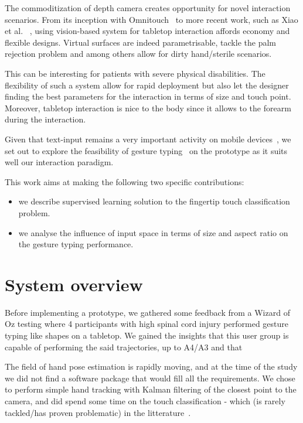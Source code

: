\documentclass{chi-ext}
\begin{document}
The commoditization of depth camera creates opportunity for novel interaction scenarios. From its inception with Omnitouch~\cite{Harrison2011} to more recent work, such as Xiao et al. ~\cite{Xiao2016}, using vision-based system for tabletop interaction affords economy and flexible designs. Virtual surfaces are indeed parametrisable, tackle the palm rejection problem and among others allow for dirty hand/sterile scenarios.

This can be interesting for patients with severe physical disabilities. The flexibility of such a system allow for rapid deployment but also let the designer finding the best parameters for the interaction in terms of size and touch point. Moreover, tabletop interaction is nice to the body since it allows to the forearm during the interaction.

Given that text-input remains a very important activity on mobile devices~\cite{McGregor2014}, we set out to explore the feasibility of gesture typing~\cite{Kristensson2004} on the prototype as it suits well our interaction paradigm.

This work aims at making the following two specific contributions:
\begin{itemize}
\item we describe supervised learning solution to the fingertip touch classification problem.
\item we analyse the influence of input space in terms of size and aspect ratio on the gesture typing performance.
\end{itemize}

\section{System overview}

Before implementing a prototype, we gathered some feedback from a Wizard of Oz testing where 4 participants with high spinal cord injury performed gesture typing like shapes on a tabletop. We gained the insights that this user group is capable of performing the said trajectories, up to A4/A3 and that

The field of hand pose estimation is rapidly moving, and at the time of the study we did not find a software package that would fill all the requirements. We chose to perform simple hand tracking with Kalman filtering of the closest point to the camera, and did spend some time on the touch classification - which (is rarely tackled/has proven problematic) in the litterature~\cite{Xiao2016}.
\end{document}
